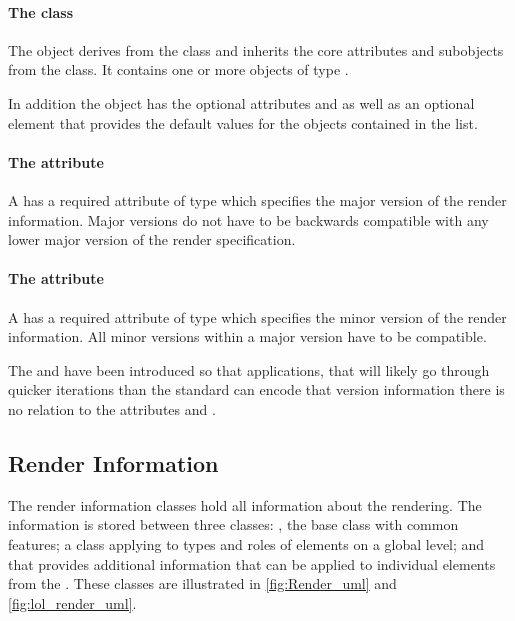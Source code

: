 \paragraph{The  class}
\label{listoflocalrenderinformation-class}

The \ListOfLocalRenderInformation object derives from the  class
and inherits the core attributes and subobjects from the 
class. It contains one or more objects of type \LocalRenderInformation.

In addition the \ListOfLocalRenderInformation object has the optional
attributes  and  as well as an optional
\DefaultValues element that provides the default values for the 
\LocalRenderInformation objects contained in the list.

\paragraph{The \fixttspace{} attribute}

A \ListOfLocalRenderInformation has a required attribute
 of type  which specifies the major version of the render information. Major versions do not have to be backwards compatible with any lower major version of the render specification.

\paragraph{The \fixttspace{} attribute}

A \ListOfLocalRenderInformation has a required attribute
 of type  which specifies the minor version of the render information.  All minor versions within a major version have to be compatible.

The  and  have been introduced so that 
applications, that will likely go through quicker iterations than the \SBML standard
can encode that version information there is no relation to the \SBML attributes 
 and . 
\subsection{Render Information}
\label{renderinformation-class}
The render information classes hold all information about the rendering. The
information is stored between three classes: \RenderInformationBase, the base class with 
common features; \GlobalRenderInformation a class applying to types and roles of 
elements on a global level; and \LocalRenderInformation that provides additional information that can be applied to individual elements from the \LayoutPackage. These classes are illustrated in \ref{fig:Render_uml} and \ref{fig:lol_render_uml}.

